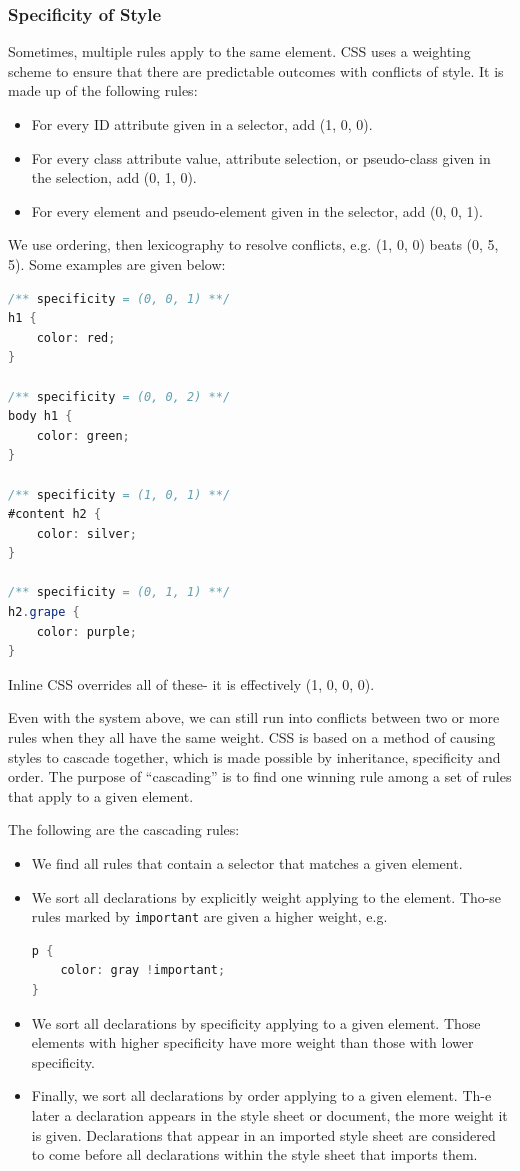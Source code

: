 \documentclass[a4paper, openany]{memoir}
\begin{document}
\subsubsection{Specificity of Style}
Sometimes, multiple rules apply to the same element. CSS uses a weighting scheme to ensure that there are predictable outcomes with conflicts of style. It is made up of the following rules:
\begin{itemize}
    \item For every ID attribute given in a selector, add (1, 0, 0). 
    \item For every class attribute value, attribute selection, or pseudo-class given in the selection, add (0, 1, 0).
    \item For every element and pseudo-element given in the selector, add (0, 0, 1).
\end{itemize}
We use ordering, then lexicography to resolve conflicts, e.g. (1, 0, 0) beats (0, 5, 5). Some examples are given below:
\begin{lstlisting}[language=java]
/** specificity = (0, 0, 1) **/
h1 {
    color: red;
}

/** specificity = (0, 0, 2) **/
body h1 {
    color: green;
}

/** specificity = (1, 0, 1) **/
#content h2 {
    color: silver;
}

/** specificity = (0, 1, 1) **/
h2.grape {
    color: purple;
}
\end{lstlisting}
Inline CSS overrides all of these- it is effectively (1, 0, 0, 0).

\noindent Even with the system above, we can still run into conflicts between two or more rules when they all have the same weight. CSS is based on a method of causing styles to cascade together, which is made possible by inheritance, specificity and order. The purpose of ``cascading'' is to find one winning rule among a set of rules that apply to a given element.

\noindent The following are the cascading rules:
\begin{itemize}
    \item We find all rules that contain a selector that matches a given element.
    \item We sort all declarations by explicitly weight applying to the element. Tho-se rules marked by \texttt{important} are given a higher weight, e.g.
    \begin{lstlisting}[language=java]
p {
    color: gray !important;
}\end{lstlisting}
    \item We sort all declarations by specificity applying to a given element. Those elements with higher specificity have more weight than those with lower specificity.
    \item Finally, we sort all declarations by order applying to a given element. Th-e later a declaration appears in the style sheet or document, the more weight it is given. Declarations that appear in an imported style sheet are considered to come before all declarations within the style sheet that imports them. 
\end{itemize}
\end{document}
